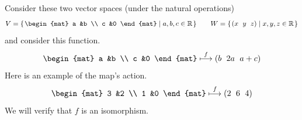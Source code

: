 \begin{frame}
\ex Consider these two vector spaces (under the natural operations)
\begin{equation*}
  V=\set{
    \begin{mat}
      a &b \\
      c &0
    \end{mat}
    \suchthat a,b,c\in\Re}
  \qquad
  W=\set{\rowvec{x &y &z}\suchthat x,y,z\in\Re}
\end{equation*}
and consider this function.
\begin{equation*}
  \begin{mat}
    a &b \\
    c &0
  \end{mat}
  \mapsunder{f}
  \rowvec{b &2a &a+c}
\end{equation*}
Here is an example of the map's action.
\begin{equation*}
  \begin{mat}
    3 &2 \\
    1 &0
  \end{mat}
  \mapsunder{f}
  \rowvec{2 &6 &4}
\end{equation*}
We will verify that $f$
is an isomorphism.
\end{frame}
